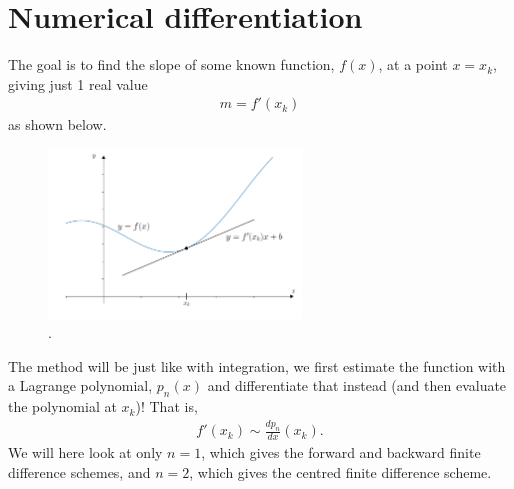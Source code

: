 







\section{Numerical differentiation}
The goal is to find the slope of some known function, $f(x)$, at a point $x=x_k$, giving just 1 real value
\begin{align*}
m=f'(x_k)
\end{align*}
as shown below.
\begin{figure}[H]
	\begin{center}
	\includegraphics[width=0.6\textwidth]{figures/ch5_derivative.pdf} 
	  \caption{.} \label{fig:ch5_derivative}
	\end{center}
\end{figure}

The method will be just like with integration, we first estimate the function with a Lagrange polynomial, $p_n(x)$ and differentiate that instead (and then evaluate the polynomial at $x_k$)! That is,
\begin{align*}
f'(x_k) \sim \frac{d p_n}{dx}(x_k).
\end{align*}
We will here look at only $n=1$, which gives the forward and backward finite difference schemes, and $n=2$, which gives the centred finite difference scheme.

